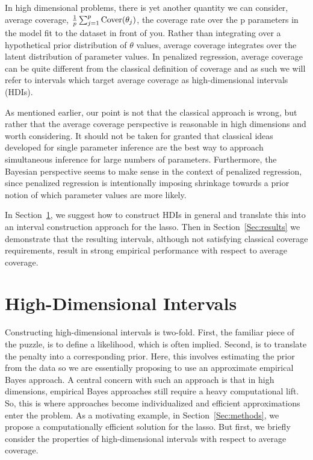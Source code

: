 In high dimensional problems, there is yet another quantity we can consider, average coverage, $\tfrac{1}{p} \sum_{j=1}^p \textrm{Cover}(\theta_j)$, the coverage rate over the p parameters in the model fit to the dataset in front of you. Rather than integrating over a hypothetical prior distribution of $\theta$ values, average coverage integrates over the latent distribution of parameter values. In penalized regression, average coverage can be quite different from the classical definition of coverage and as such we will refer to intervals which target average coverage as high-dimensional intervals (HDIs).

As mentioned earlier, our point is not that the classical approach is wrong, but rather that the average coverage perspective is reasonable in high dimensions and worth considering. It should not be taken for granted that classical ideas developed for single parameter inference are the best way to approach simultaneous inference for large numbers of parameters. Furthermore, the Bayesian perspective seems to make sense in the context of penalized regression, since penalized regression is intentionally imposing shrinkage towards a prior notion of which parameter values are more likely.

In Section~\ref{sec:hdi}, we suggest how to construct HDIs in general and translate this into an interval construction approach for the lasso. Then in Section~\ref{Sec:results} we demonstrate that the resulting intervals, although not satisfying classical coverage requirements, result in strong empirical performance with respect to average coverage.


\section{High-Dimensional Intervals}
\label{sec:hdi}

Constructing high-dimensional intervals is two-fold. First, the familiar piece of the puzzle, is to define a likelihood, which is often implied. Second, is to translate the penalty into a corresponding prior. Here, this involves estimating the prior from the data so we are essentially proposing to use an approximate empirical Bayes approach. A central concern with such an approach is that in high dimensions, empirical Bayes approaches still require a heavy computational lift. So, this is where approaches become individualized and efficient approximations enter the problem. As a motivating example, in Section~\ref{Sec:methods}, we propose a computationally efficient solution for the lasso. But first, we briefly consider the properties of high-dimensional intervals with respect to average coverage.

